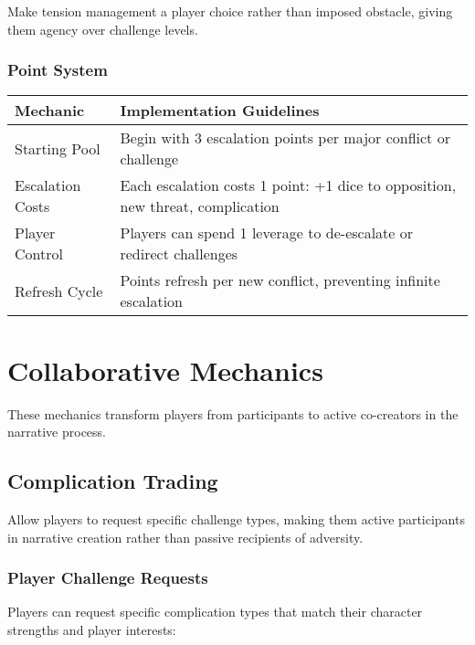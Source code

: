 Make tension management a player choice rather than imposed obstacle, giving them agency over challenge levels.

\subsubsection*{Point System}

\begin{fatebox}
\begin{tabularx}{\textwidth}{lX}
\toprule
\textbf{Mechanic} & \textbf{Implementation Guidelines} \\
\midrule
Starting Pool & Begin with 3 escalation points per major conflict or challenge \\
Escalation Costs & Each escalation costs 1 point: +1 dice to opposition, new threat, complication \\
Player Control & Players can spend 1 leverage to de-escalate or redirect challenges \\
Refresh Cycle & Points refresh per new conflict, preventing infinite escalation \\
\bottomrule
\end{tabularx}
\end{fatebox}

\section*{Collaborative Mechanics}

These mechanics transform players from participants to active co-creators in the narrative process.

\subsection*{Complication Trading}

Allow players to request specific challenge types, making them active participants in narrative creation rather than passive recipients of adversity.

\subsubsection*{Player Challenge Requests}

Players can request specific complication types that match their character strengths and player interests:

